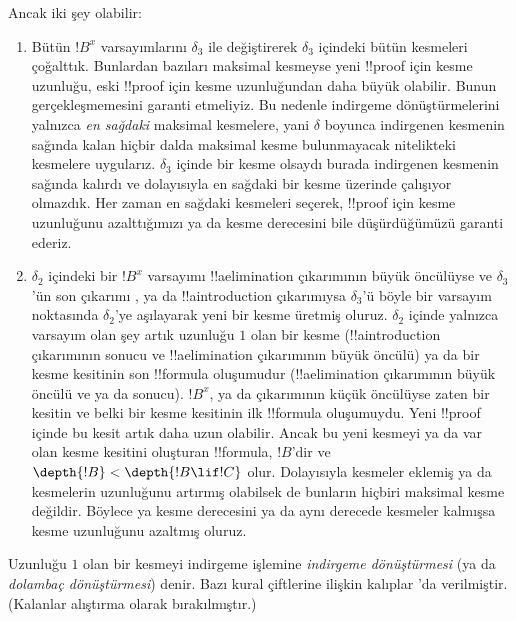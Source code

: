 \documentclass[../../../include/open-logic-section]{subfiles}
\begin{document}
Ancak iki şey olabilir:
\begin{enumerate}
  \item Bütün $!B^x$ varsayımlarını $\delta_3$ ile değiştirerek
  $\delta_3$ içindeki bütün kesmeleri çoğalttık. Bunlardan bazıları
  maksimal kesmeyse yeni !!{proof} için kesme uzunluğu, eski !!{proof}
  için kesme uzunluğundan daha büyük olabilir. Bunun gerçekleşmemesini
  garanti etmeliyiz. Bu nedenle indirgeme dönüştürmelerini yalnızca
  \emph{en sağdaki} maksimal kesmelere, yani $\delta$ boyunca indirgenen
  kesmenin sağında kalan hiçbir dalda maksimal kesme bulunmayacak
  nitelikteki kesmelere uygularız. $\delta_3$ içinde bir kesme olsaydı
  burada indirgenen kesmenin sağında kalırdı ve dolayısıyla en sağdaki
  bir kesme üzerinde çalışıyor olmazdık. Her zaman en sağdaki kesmeleri
  seçerek, !!{proof} için kesme uzunluğunu azalttığımızı ya da kesme
  derecesini bile düşürdüğümüzü garanti ederiz.
  \item $\delta_2$ içindeki bir $!B^x$ varsayımı !!a{elimination}
  çıkarımının büyük öncülüyse ve $\delta_3$'ün son çıkarımı
  \Elim{\lor}, \Elim{\lexists} ya da !!a{introduction} çıkarımıysa
  $\delta_3$'ü böyle bir varsayım noktasında $\delta_2$'ye aşılayarak
  yeni bir kesme üretmiş oluruz. $\delta_2$ içinde yalnızca varsayım
  olan şey artık uzunluğu $1$ olan bir kesme (!!a{introduction}
  çıkarımının sonucu ve !!a{elimination} çıkarımının büyük öncülü) ya
  da bir kesme kesitinin son !!{formula} oluşumudur (!!a{elimination}
  çıkarımının büyük öncülü ve \Elim{\lor} ya da \Elim{\lexists}
  sonucu). $!B^x$, \Elim{\lor} ya da \Elim{\lexists} çıkarımının küçük
  öncülüyse zaten bir kesitin ve belki bir kesme kesitinin ilk
  !!{formula} oluşumuydu. Yeni !!{proof} içinde bu kesit artık daha uzun
  olabilir. Ancak bu yeni kesmeyi ya da var olan kesme kesitini oluşturan
  !!{formula}, $!B$'dir ve $\depth{!B} < \depth{!B \lif !C}$ olur.
  Dolayısıyla kesmeler eklemiş ya da kesmelerin uzunluğunu artırmış
  olabilsek de bunların hiçbiri maksimal kesme değildir. Böylece ya
  kesme derecesini ya da aynı derecede kesmeler kalmışsa kesme
  uzunluğunu azaltmış oluruz.
\end{enumerate}

Uzunluğu $1$ olan bir kesmeyi indirgeme işlemine \emph{indirgeme
dönüştürmesi} (ya da \emph{dolambaç dönüştürmesi}) denir. Bazı kural
çiftlerine ilişkin kalıplar 'da
verilmiştir. (Kalanlar alıştırma olarak bırakılmıştır.)
\end{document}
